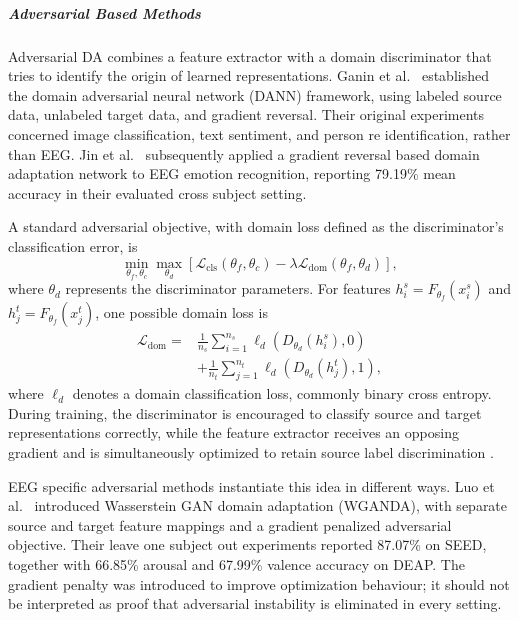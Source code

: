 \documentclass[ASNA,twocolumn]{USG}
\begin{document}
\subparagraph{Adversarial Based Methods}

Adversarial DA combines a feature extractor with a domain discriminator that tries to identify the origin of learned representations. Ganin et al.~\cite{ganin2016domain} established the domain adversarial neural network (DANN) framework, using labeled source data, unlabeled target data, and gradient reversal. Their original experiments concerned image classification, text sentiment, and person re identification, rather than EEG. Jin et al.~\cite{jin2017eeg} subsequently applied a gradient reversal based domain adaptation network to EEG emotion recognition, reporting 79.19\% mean accuracy in their evaluated cross subject setting.

A standard adversarial objective, with domain loss defined as the discriminator's classification error, is
\begin{equation}
\min_{\theta_f,\theta_c}\max_{\theta_d}
\left[\mathcal{L}_{\mathrm{cls}}(\theta_f,\theta_c)
-\lambda\mathcal{L}_{\mathrm{dom}}(\theta_f,\theta_d)\right],
\label{eq:dann_subjectind}
\end{equation}
where $\theta_d$ represents the discriminator parameters. For features $h_i^s=F_{\theta_f}(x_i^s)$ and $h_j^t=F_{\theta_f}(x_j^t)$, one possible domain loss is
\begin{equation}
\begin{aligned}
\mathcal{L}_{\mathrm{dom}}={}&
\frac{1}{n_s}\sum_{i=1}^{n_s}
\ell_d\!\left(D_{\theta_d}(h_i^s),0\right)\\
&+\frac{1}{n_t}\sum_{j=1}^{n_t}
\ell_d\!\left(D_{\theta_d}(h_j^t),1\right),
\end{aligned}
\label{eq:dann_domain_loss_subjectind}
\end{equation}
where $\ell_d$ denotes a domain classification loss, commonly binary cross entropy. During training, the discriminator is encouraged to classify source and target representations correctly, while the feature extractor receives an opposing gradient and is simultaneously optimized to retain source label discrimination \cite{ganin2016domain}.

EEG specific adversarial methods instantiate this idea in different ways. Luo et al.~\cite{luo2018iconip_wganda} introduced Wasserstein GAN domain adaptation (WGANDA), with separate source and target feature mappings and a gradient penalized adversarial objective. Their leave one subject out experiments reported 87.07\% on SEED, together with 66.85\% arousal and 67.99\% valence accuracy on DEAP. The gradient penalty was introduced to improve optimization behaviour; it should not be interpreted as proof that adversarial instability is eliminated in every setting.
\end{document}
